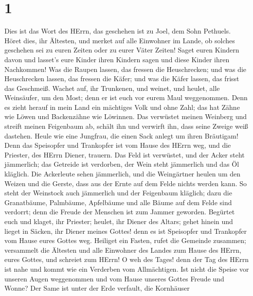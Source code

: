 \hypertarget{section}{%
\section{1}\label{section}}

 Dies ist das Wort des HErrn, das geschehen ist zu Joel, dem
Sohn Pethuels.  Höret dies, ihr Ältesten, und merket auf
alle Einwohner im Lande, ob solches geschehen sei zu euren Zeiten oder
zu eurer Väter Zeiten!  Saget euren Kindern davon und
lasset's eure Kinder ihren Kindern sagen und diese Kinder ihren
Nachkommen!  Was die Raupen lassen, das fressen die
Heuschrecken; und was die Heuschrecken lassen, das fressen die Käfer;
und was die Käfer lassen, das frisst das Geschmeiß.  Wachet
auf, ihr Trunkenen, und weinet, und heulet, alle Weinsäufer, um den
Most; denn er ist euch vor eurem Maul weggenommen.  Denn es
zieht herauf in mein Land ein mächtiges Volk und ohne Zahl; das hat
Zähne wie Löwen und Backenzähne wie Löwinnen.  Das verwüstet
meinen Weinberg und streift meinen Feigenbaum ab, schält ihn und
verwirft ihn, dass seine Zweige weiß dastehen.  Heule wie
eine Jungfrau, die einen Sack anlegt um ihren Bräutigam! 
Denn das Speisopfer und Trankopfer ist vom Hause des HErrn weg, und die
Priester, des HErrn Diener, trauern.  Das Feld ist
verwüstet, und der Acker steht jämmerlich; das Getreide ist verdorben,
der Wein steht jämmerlich und das Öl kläglich.  Die
Ackerleute sehen jämmerlich, und die Weingärtner heulen um den Weizen
und die Gerste, dass aus der Ernte auf dem Felde nichts werden kann.
 So steht der Weinstock auch jämmerlich und der Feigenbaum
kläglich; dazu die Granatbäume, Palmbäume, Apfelbäume und alle Bäume auf
dem Felde sind verdorrt; denn die Freude der Menschen ist zum Jammer
geworden.  Begürtet euch und klaget, ihr Priester; heulet,
ihr Diener des Altars; gehet hinein und lieget in Säcken, ihr Diener
meines Gottes! denn es ist Speisopfer und Trankopfer vom Hause eures
Gottes weg.  Heiliget ein Fasten, rufet die Gemeinde
zusammen; versammelt die Ältesten und alle Einwohner des Landes zum
Hause des HErrn, eures Gottes, und schreiet zum HErrn!  O
weh des Tages! denn der Tag des HErrn ist nahe und kommt wie ein
Verderben vom Allmächtigen.  Ist nicht die Speise vor
unseren Augen weggenommen und vom Hause unseres Gottes Freude und Wonne?
 Der Same ist unter der Erde verfault, die Kornhäuser

